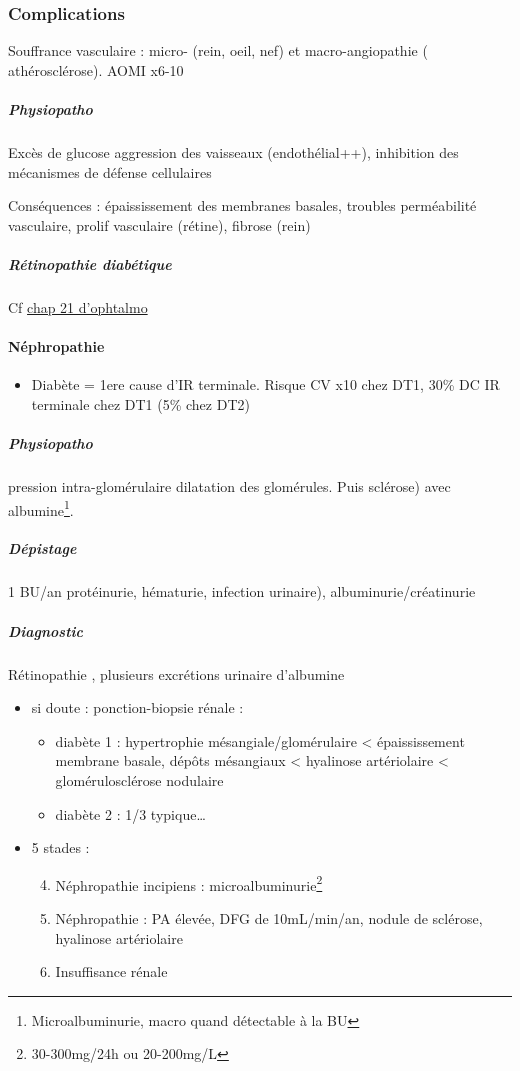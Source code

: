 \documentclass[11pt]{article}
\begin{document}
\subsubsection{Complications}
\label{sec:org889e310}
Souffrance vasculaire : micro- (rein, oeil, nef) et macro-angiopathie (\inc
athérosclérose). AOMI x6-10

\subparagraph{Physiopatho}
\label{sec:org6e79a17}
Excès de glucose \thus aggression des vaisseaux (endothélial++), inhibition des
mécanismes de défense cellulaires

Conséquences : épaississement des membranes basales, troubles perméabilité
vasculaire, prolif vasculaire (rétine), fibrose (rein)

\subparagraph{Rétinopathie diabétique}
\label{sec:orgdd109af}
Cf \hyperref[org69d5a72]{chap 21 d'ophtalmo}
\paragraph{Néphropathie}
\label{sec:org9ad1312}
\begin{itemize}
\item Diabète = 1ere cause d'IR terminale. Risque CV x10 chez DT1, 30\% DC IR terminale
chez DT1 (5\% chez DT2)
\end{itemize}

\subparagraph{Physiopatho}
\label{sec:org6013b97}
\inc pression intra-glomérulaire \thus dilatation des glomérules. Puis sclérose) avec \inc albumine\footnote{Microalbuminurie, macro quand détectable à la BU}.

\subparagraph{Dépistage}
\label{sec:org77e0152}
1 BU/an protéinurie, hématurie, infection urinaire), albuminurie/créatinurie 
\subparagraph{Diagnostic}
\label{sec:orgbfac198}
Rétinopathie , plusieurs excrétions urinaire d'albumine \inc 
\begin{itemize}
\item si doute : ponction-biopsie rénale : 
\begin{itemize}
\item diabète 1 : hypertrophie mésangiale/glomérulaire < épaississement membrane basale, dépôts
mésangiaux < hyalinose artériolaire < glomérulosclérose nodulaire
\item diabète 2 : 1/3 typique\ldots{}
\end{itemize}
\item 5 stades : 
\begin{enumerate}
\setcounter{enumi}{3}
\item Néphropathie incipiens : microalbuminurie\footnote{30-300mg/24h ou 20-200mg/L}
\item Néphropathie : PA élevée, DFG \dec de 10mL/min/an, nodule de sclérose,
hyalinose artériolaire
\item Insuffisance rénale
\end{enumerate}
\end{itemize}
\end{document}
